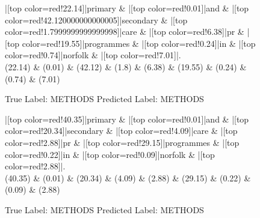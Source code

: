 \documentclass[a4paper, landscape]{article}
\begin{document}
\begin{figure}
\begin{center}
\begin{dependency}
\begin{deptext}
|[top color=red!22.14]|primary \& |[top color=red!0.01]|and \& |[top color=red!42.120000000000005]|secondary \& |[top color=red!1.7999999999999998]|care \& |[top color=red!6.38]|pr \& |[top color=red!19.55]|programmes \& |[top color=red!0.24]|in \& |[top color=red!0.74]|norfolk \& |[top color=red!7.01]|.\\
(22.14) \& (0.01) \& (42.12) \& (1.8) \& (6.38) \& (19.55) \& (0.24) \& (0.74) \& (7.01)\\
\end{deptext}
\end{dependency}
\end{center}
\caption{True Label: METHODS Predicted Label: METHODS}
\end{figure}
\clearpage
\begin{figure}
\begin{center}
\begin{dependency}
\begin{deptext}
|[top color=red!40.35]|primary \& |[top color=red!0.01]|and \& |[top color=red!20.34]|secondary \& |[top color=red!4.09]|care \& |[top color=red!2.88]|pr \& |[top color=red!29.15]|programmes \& |[top color=red!0.22]|in \& |[top color=red!0.09]|norfolk \& |[top color=red!2.88]|.\\
(40.35) \& (0.01) \& (20.34) \& (4.09) \& (2.88) \& (29.15) \& (0.22) \& (0.09) \& (2.88)\\
\end{deptext}
\end{dependency}
\end{center}
\caption{True Label: METHODS Predicted Label: METHODS}
\end{figure}
\end{document}
